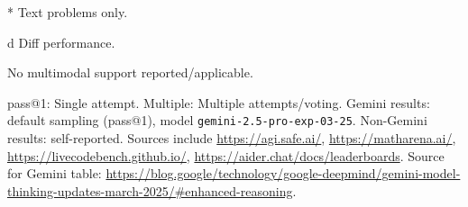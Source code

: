 \documentclass{scrartcl}
\begin{document}
\begin{table}[H]
\begin{threeparttable}
\begin{tabularx}{\textwidth}{@{} L T{2.1} T{2.1} T{2.1} T{2.1} T{2.1} T{2.1} @{}}
            \bottomrule
        \end{tabularx}
        \begin{tablenotes}
            \footnotesize
            \item[*] Text problems only.
            \item[d] Diff performance.
            \item[\dag] No multimodal support reported/applicable.
            \item pass@1: Single attempt. Multiple: Multiple attempts/voting. Gemini results: default sampling (pass@1), model \texttt{gemini-2.5-pro-exp-03-25}. Non-Gemini results: self-reported. Sources include \url{https://agi.safe.ai/}, \url{https://matharena.ai/}, \url{https://livecodebench.github.io/}, \url{https://aider.chat/docs/leaderboards}. Source for Gemini table: \url{https://blog.google/technology/google-deepmind/gemini-model-thinking-updates-march-2025/\#enhanced-reasoning}.
        \end{tablenotes}
    \end{threeparttable}
\end{table}

\end{document}
